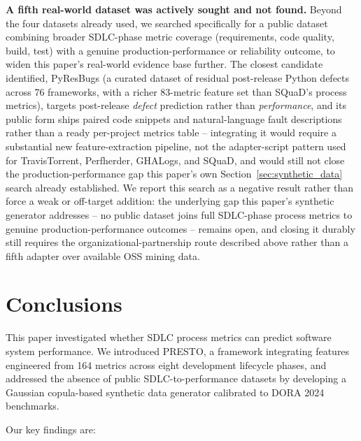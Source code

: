 \documentclass[technologies,article,submit,pdftex,moreauthors]{Definitions/mdpi}
\begin{document}
\textbf{A fifth real-world dataset was actively sought and not found.}
Beyond the four datasets already used, we searched specifically for a
public dataset combining broader SDLC-phase metric coverage
(requirements, code quality, build, test) with a genuine
production-performance or reliability outcome, to widen this paper's
real-world evidence base further. The closest candidate identified,
PyResBugs (a curated dataset of residual post-release Python defects
across 76 frameworks, with a richer 83-metric feature set than SQuaD's
process metrics), targets post-release \emph{defect} prediction rather
than \emph{performance}, and its public form ships paired code snippets
and natural-language fault descriptions rather than a ready per-project
metrics table -- integrating it would require a substantial new
feature-extraction pipeline, not the adapter-script pattern used for
TravisTorrent, Perfherder, GHALogs, and SQuaD, and would still not close
the production-performance gap this paper's own
Section~\ref{sec:synthetic_data} search already established. We report
this search as a negative result rather than force a weak or off-target
addition: the underlying gap this paper's synthetic generator addresses
-- no public dataset joins full SDLC-phase process metrics to genuine
production-performance outcomes -- remains open, and closing it durably
still requires the organizational-partnership route described above
rather than a fifth adapter over available OSS mining data.

\section{Conclusions}\label{sec:conclusions}

This paper investigated whether SDLC process metrics can predict
software system performance. We introduced PRESTO, a framework
integrating features engineered from 164 metrics across eight
development lifecycle phases, and addressed the absence of public
SDLC-to-performance datasets by developing a Gaussian copula-based
synthetic data generator calibrated to DORA 2024 benchmarks.

Our key findings are:
\end{document}
